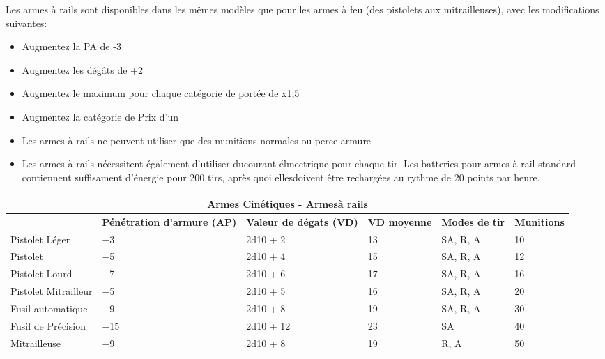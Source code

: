 Les armes à rails sont disponibles dans les mêmes modèles que pour les armes à feu (des pistolets aux mitrailleuses), avec les modifications suivantes: 

\begin{itemize}
   \item Augmentez la PA de -3
   \item Augmentez les dégâts de +2
   \item Augmentez le maximum pour chaque catégorie de portée de x1,5
   \item Augmentez la catégorie de Prix d'un
   \item Les armes à rails ne peuvent utiliser que des munitions normales ou perce-armure
   \item Les armes à rails nécessitent également d'utiliser ducourant élmectrique pour chaque tir. Les batteries pour armes à rail standard contiennent suffisament d'énergie pour 200 tirs, après quoi ellesdoivent être rechargées au rythme de 20 points par heure.
\end{itemize} 

\begin{table} \begin{tabularx}{\textwidth}{|l|X|X|X|X|l|} \hline

\multicolumn{6}{|c|}{\textbf{Armes Cinétiques - Armesà rails}} \\ \hline

&\textbf{Pénétration d'armure (AP)}	&\textbf{Valeur de dégats (VD)}	&\textbf{VD moyenne}	&\textbf{Modes de tir}	&\textbf{Munitions} \\ \hline

Pistolet Léger	&$-$3	&2d10 + 2	&13	&SA, R, A	&10 \\ \hline

Pistolet	&$-$5	&2d10 + 4	&15	&SA, R, A	&12 \\ \hline

Pistolet Lourd	&$-$7	&2d10 + 6	&17	&SA, R, A	&16 \\ \hline

Pistolet Mitrailleur &$-$5	&2d10 + 5	&16	&SA, R, A	&20 \\ \hline

Fusil automatique	&$-$9	&2d10 + 8	&19	&SA, R, A	&30 \\ \hline

Fusil de Précision	&$-$15	&2d10 + 12	&23	&SA	&40 \\ \hline

Mitrailleuse	&$-$9	&2d10 + 8	&19	&R, A	&50 \\ \hline

\end{tabularx} \label{tab:kinetic-railguns} \end{table} 

